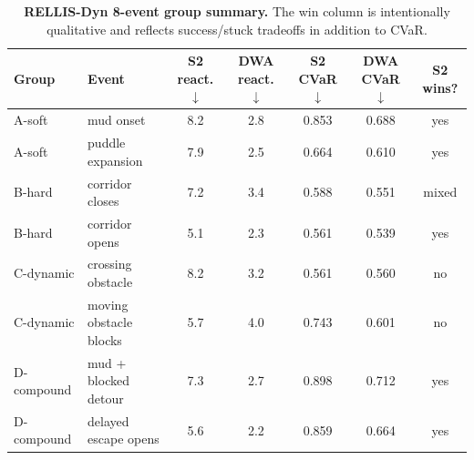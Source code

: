 \begin{table}[t]
\centering
\small
\caption{\textbf{RELLIS-Dyn 8-event group summary.} The win column is intentionally qualitative and reflects success/stuck tradeoffs in addition to CVaR.}
\label{tab:app_rellis_dyn_8event_groups}
\begin{tabular}{llccccc}
\toprule
Group & Event & S2 react. $\downarrow$ & DWA react. $\downarrow$ & S2 CVaR $\downarrow$ & DWA CVaR $\downarrow$ & S2 wins? \\
\midrule
A-soft & mud onset & 8.2 & 2.8 & 0.853 & 0.688 & yes \\
A-soft & puddle expansion & 7.9 & 2.5 & 0.664 & 0.610 & yes \\
B-hard & corridor closes & 7.2 & 3.4 & 0.588 & 0.551 & mixed \\
B-hard & corridor opens & 5.1 & 2.3 & 0.561 & 0.539 & yes \\
C-dynamic & crossing obstacle & 8.2 & 3.2 & 0.561 & 0.560 & no \\
C-dynamic & moving obstacle blocks & 5.7 & 4.0 & 0.743 & 0.601 & no \\
D-compound & mud + blocked detour & 7.3 & 2.7 & 0.898 & 0.712 & yes \\
D-compound & delayed escape opens & 5.6 & 2.2 & 0.859 & 0.664 & yes \\
\bottomrule
\end{tabular}
\end{table}
